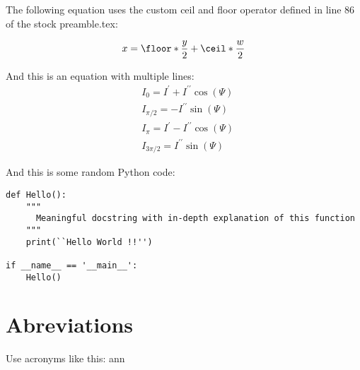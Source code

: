 The following equation uses the custom ceil and floor operator defined in line 86 of the stock preamble.tex:

\begin{equation}
x = \floor*{\frac{y}{2}} + \ceil*{\frac{w}{2}}
\end{equation}


And this is an equation with multiple lines:
\begin{equation}
\begin{aligned}
&I_{0}=I^{\prime}+I^{\prime\prime}\cos(\varPsi)   \\
&I_{\pi/2}=-I^{\prime\prime}\sin(\varPsi)                \\
&I_{\pi}=I^{\prime}-I^{\prime\prime}\cos(\varPsi)   \\
&I_{3\pi/2}=I^{\prime\prime}\sin(\varPsi)
\end{aligned}
\end{equation}

And this is some random Python code:

\begin{lstlisting}[style = Python]
def Hello():
    """
      Meaningful docstring with in-depth explanation of this function
    """
    print(``Hello World !!'')

if __name__ == '__main__':
    Hello()
\end{lstlisting}
\section{Abreviations}

Use acronyms like this: \ac{ann}